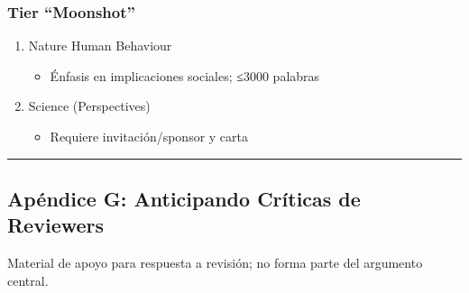 \subsubsection{Tier ``Moonshot''}\label{tier-moonshot}

\begin{enumerate}
\def\labelenumi{\arabic{enumi}.}
\setcounter{enumi}{3}
\tightlist
\item
  Nature Human Behaviour

  \begin{itemize}
  \tightlist
  \item
    Énfasis en implicaciones sociales; ≤3000 palabras
  \end{itemize}
\item
  Science (Perspectives)

  \begin{itemize}
  \tightlist
  \item
    Requiere invitación/sponsor y carta
  \end{itemize}
\end{enumerate}

\begin{center}\rule{0.5\linewidth}{0.5pt}\end{center}

\subsection{Apéndice G: Anticipando Críticas de
Reviewers}\label{apuxe9ndice-g-anticipando-cruxedticas-de-reviewers}

Material de apoyo para respuesta a revisión; no forma parte del
argumento central.

